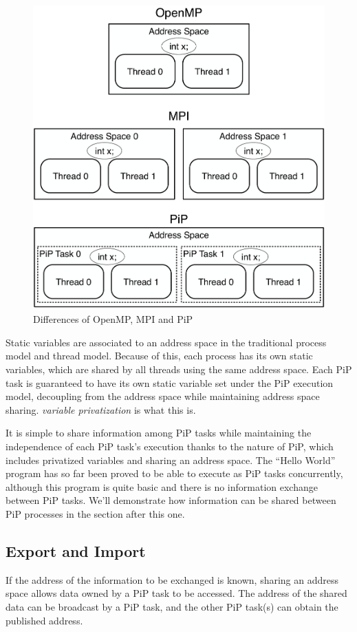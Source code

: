 \begin{figure}[ht]
\centering
\includegraphics[width=0.7\columnwidth]{tasks/Figs/AddressSpace-OpenMP-MPI-PiP.pdf}
\caption{Differences of OpenMP, MPI and PiP}
\label{fig:tasks:hello-var-omp}
\end{figure}

Static variables are associated to an address space in the traditional
process model and thread model. Because of this, each process has its
own static variables, which are shared by all threads using the same
address space. Each PiP task is guaranteed to have its own static
variable set under the PiP execution model, decoupling from the
address space while maintaining address space sharing. {\it variable
  privatization} is what this is.

It is simple to share information among PiP tasks while maintaining
the independence of each PiP task's execution thanks to the nature of
PiP, which includes privatized variables and sharing an address
space. The ``Hello World'' program has so far been proved to be able to
execute as PiP tasks concurrently, although this program is quite
basic and there is no information exchange between PiP tasks. We'll
demonstrate how information can be shared between PiP processes in the
section after this one.

\subsection{Export and Import}

If the address of the information to be exchanged is known, sharing an
address space allows data owned by a PiP task to be accessed. The
address of the shared data can be broadcast by a PiP task, and the
other PiP task(s) can obtain the published address.  

